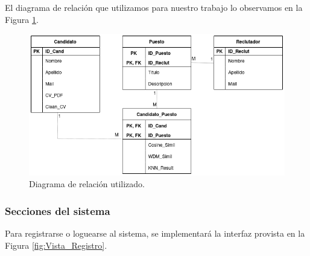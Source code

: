 \documentclass[12pt,a4paper]{article}
\begin{document}
\begin{sloppypar}
El diagrama de relación que utilizamos para nuestro trabajo lo observamos en la Figura \ref{fig:Entity_Relation}.

\begin{figure}[H]    %
  \centering
  \includegraphics[width=1\textwidth]{images/BD_Entity_Relation.png}
  \caption{Diagrama de relación utilizado.}  
  \label{fig:Entity_Relation}
\end{figure}

\cleardoublepage

\subsubsection{Secciones del sistema}

Para registrarse o loguearse al sistema, se implementará la interfaz provista en la Figura \ref{fig:Vista_Registro}.


\end{sloppypar}
\end{document}
